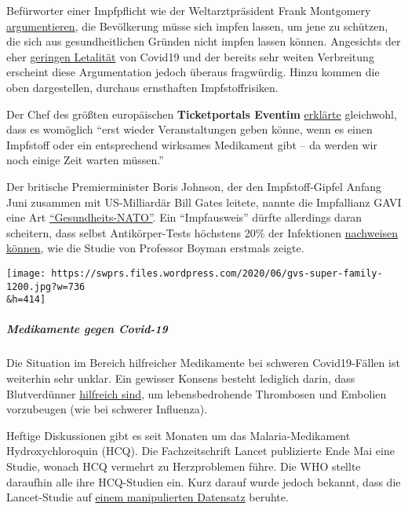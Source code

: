 Befürworter einer Impfpflicht wie der Weltarztpräsident Frank Montgomery
\href{https://www.n-tv.de/panorama/Weltaerztepraesident-fordert-Impfpflicht-article21793158.html}{argumentieren},
die Bevölkerung müsse sich impfen lassen, um jene zu schützen, die sich
aus gesundheitlichen Gründen nicht impfen lassen können. Angesichts der
eher \href{https://swprs.org/studies-on-covid-19-lethality/}{geringen
Letalität} von Covid19 und der bereits sehr weiten Verbreitung erscheint
diese Argumentation jedoch überaus fragwürdig. Hinzu kommen die oben
dargestellen, durchaus ernsthaften Impfstoffrisiken.

Der Chef des größten europäischen \textbf{Ticketportals Eventim}
\href{https://www.n-tv.de/mediathek/audio/Ohne-Impfstoff-keine-Konzerte-article21821926.html}{erklärte}
gleichwohl, dass es womöglich ``erst wieder Veranstaltungen geben könne,
wenn es einen Impfstoff oder ein entsprechend wirksames Medikament gibt
-- da werden wir noch einige Zeit warten müssen.''

Der britische Premierminister Boris Johnson, der den Impfstoff-Gipfel
Anfang Juni zusammen mit US-Milliardär Bill Gates leitete, nannte die
Impfallianz GAVI eine Art
\href{https://www.youtube.com/watch?v=1S0LAbObZV0}{``Gesundheits-NATO''}.
Ein ``Impfausweis'' dürfte allerdings daran scheitern, dass selbst
Antikörper-Tests höchstens 20\% der Infektionen
\href{https://swprs.org/coronavirus-antibody-tests-show-only-one-fifth-of-infections/}{nachweisen
können}, wie die Studie von Professor Boyman erstmals zeigte.

\texttt{[image: https://swprs.files.wordpress.com/2020/06/gvs-super-family-1200.jpg?w=736\\\&h=414]}

\hypertarget{medikamente-gegen-covid-19}{%
\subparagraph{\texorpdfstring{\textbf{Medikamente gegen
Covid-19}}{Medikamente gegen Covid-19}}\label{medikamente-gegen-covid-19}}

Die Situation im Bereich hilfreicher Medikamente bei schweren
Covid19-Fällen ist weiterhin sehr unklar. Ein gewisser Konsens besteht
lediglich darin, dass Blutverdünner
\href{https://www.webmd.com/lung/news/20200506/blood-thinners-could-boost-covid19-survival\#1}{hilfreich
sind}, um lebensbedrohende Thrombosen und Embolien vorzubeugen (wie bei
schwerer Influenza).

Heftige Diskussionen gibt es seit Monaten um das Malaria-Medikament
Hydroxychloroquin (HCQ). Die Fachzeitschrift Lancet publizierte Ende Mai
eine Studie, wonach HCQ vermehrt zu Herzproblemen führe. Die WHO stellte
daraufhin alle ihre HCQ-Studien ein. Kurz darauf wurde jedoch bekannt,
dass die Lancet-Studie auf
\href{https://www.theguardian.com/world/2020/jun/03/covid-19-surgisphere-who-world-health-organization-hydroxychloroquine}{einem
manipulierten Datensatz} beruhte.

